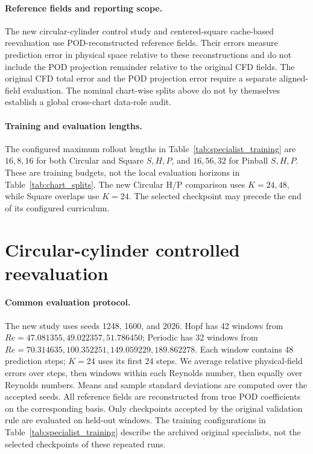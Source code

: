 \documentclass{article}
\begin{document}
\paragraph{Reference fields and reporting scope.}
The new circular-cylinder control study and centered-square cache-based
reevaluation use POD-reconstructed reference fields. Their errors measure
prediction error in physical space relative to these reconstructions and
do not include the POD projection remainder relative to the original CFD
fields. The original CFD total error and the POD projection error require
a separate aligned-field evaluation. The nominal chart-wise splits above
do not by themselves establish a global cross-chart data-role audit.

\paragraph{Training and evaluation lengths.}
The configured maximum rollout lengths in Table~\ref{tab:specialist_training}
are $16,8,16$ for both Circular and Square $S,H,P$, and $16,56,32$ for
Pinball $S,H,P$. These are training budgets, not the local evaluation
horizons in Table~\ref{tab:chart_splits}. The new Circular H/P comparison
uses $K=24,48$, while Square overlaps use $K=24$. The selected checkpoint
may precede the end of its configured curriculum.

\section{Circular-cylinder controlled reevaluation}
\label{app:circular}

\paragraph{Common evaluation protocol.}
The new study uses seeds 1248, 1600, and 2026. Hopf has 42 windows
from $Re=47.081355,49.022357,51.786450$; Periodic has 32 windows from
$Re=70.314635,100.352251,149.059229,189.862278$. Each window contains
48 prediction steps; $K=24$ uses its first 24 steps. We average relative
physical-field errors over steps, then windows within each Reynolds
number, then equally over Reynolds numbers. Means and sample standard
deviations are computed over the accepted seeds. All reference fields
are reconstructed from true POD coefficients on the corresponding basis.
Only checkpoints accepted by the original validation rule are evaluated
on held-out windows. The training configurations in
Table~\ref{tab:specialist_training} describe the archived original
specialists, not the selected checkpoints of these repeated runs.
\end{document}
